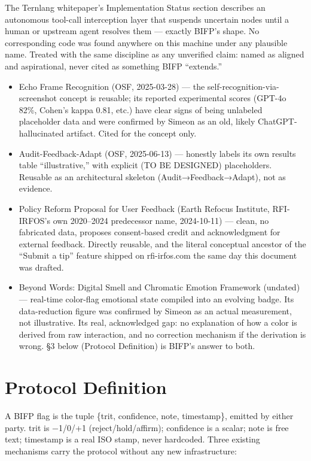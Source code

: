 \documentclass[11pt,a4paper]{article}
\begin{document}
\begin{tcolorbox}[lowbox, title={TAP (“Ternary Actuator Protocol”) — named, unverified}]
The Ternlang whitepaper's Implementation Status section describes an autonomous tool-call interception layer that suspends uncertain nodes until a human or upstream agent resolves them — exactly BIFP's shape. No corresponding code was found anywhere on this machine under any plausible name. Treated with the same discipline as any unverified claim: named as aligned and aspirational, never cited as something BIFP “extends.”
\end{tcolorbox}
\vspace{4pt}

\begin{itemize}[leftmargin=14pt, itemsep=2pt]
  \item Echo Frame Recognition (OSF, 2025-03-28) — the self-recognition-via-screenshot concept is reusable; its reported experimental scores (GPT-4o 82\%, Cohen's kappa 0.81, etc.) have clear signs of being unlabeled placeholder data and were confirmed by Simeon as an old, likely ChatGPT-hallucinated artifact. Cited for the concept only.
  \item Audit-Feedback-Adapt (OSF, 2025-06-13) — honestly labels its own results table “illustrative,” with explicit (TO BE DESIGNED) placeholders. Reusable as an architectural skeleton (Audit→Feedback→Adapt), not as evidence.
  \item Policy Reform Proposal for User Feedback (Earth Refocus Institute, RFI-IRFOS's own 2020–2024 predecessor name, 2024-10-11) — clean, no fabricated data, proposes consent-based credit and acknowledgment for external feedback. Directly reusable, and the literal conceptual ancestor of the “Submit a tip” feature shipped on rfi-irfos.com the same day this document was drafted.
  \item Beyond Words: Digital Smell and Chromatic Emotion Framework (undated) — real-time color-flag emotional state compiled into an evolving badge. Its data-reduction figure was confirmed by Simeon as an actual measurement, not illustrative. Its real, acknowledged gap: no explanation of how a color is derived from raw interaction, and no correction mechanism if the derivation is wrong. §3 below (Protocol Definition) is BIFP's answer to both.
\end{itemize}

\section{Protocol Definition}
A BIFP flag is the tuple \{trit, confidence, note, timestamp\}, emitted by either party. trit is −1/0/+1 (reject/hold/affirm); confidence is a scalar; note is free text; timestamp is a real ISO stamp, never hardcoded. Three existing mechanisms carry the protocol without any new infrastructure:
\end{document}
